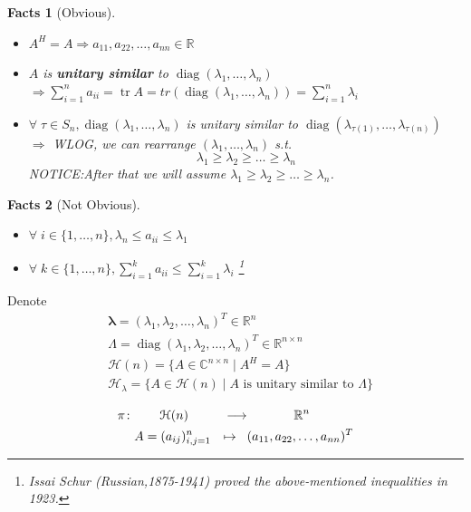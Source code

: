 \documentclass[11pt]{amsart}
\numberwithin{equation}{section}
\theoremstyle{plain}
\newtheorem*{fact}{Facts}
\theoremstyle{plain}
\numberwithin{equation}{section}
\theoremstyle{remark}
\DeclareMathOperator{\diag}{diag}
\DeclareMathOperator{\tr}{tr}
\begin{document}
\begin{fact}[Obvious]\
	\begin{itemize}
		\item $A^H=A \Rightarrow a_{11},a_{22},\ldots,a_{nn} \in \mathbb{R}$
		\item $A$ is \textbf{unitary similar} to $\diag(\lambda_1,\ldots,\lambda_n)$ \\
		$\Rightarrow \sum_{i=1}^n a_{ii} = \tr A = tr (\diag(\lambda_1,\ldots,\lambda_n))= \sum_{i=1}^n \lambda_i$
		\item $\forall\; \tau \in S_n, \diag (\lambda_1,\ldots,\lambda_n)$ is unitary similar to
		$\diag (\lambda_{\tau(1)},\ldots,\lambda_{\tau(n)})$ \\
		$\Rightarrow$ WLOG, we can rearrange $(\lambda_1,\ldots,\lambda_n)$ s.t.
		$$\lambda_1 \geqslant \lambda_2\geqslant\ldots\geqslant\lambda_n$$
		NOTICE:After that we will assume $\lambda_1 \geqslant \lambda_2\geqslant\ldots\geqslant\lambda_n$.
	\end{itemize}
\end{fact}
\begin{fact}[Not Obvious]\
	\begin{itemize}
		\item $\forall\; i \in \{1,\ldots, n\}, \lambda_n \leqslant a_{ii} \leqslant \lambda_1$
		\item $\forall\; k \in \{1,\ldots, n\}, \sum_{i=1}^k a_{ii} \leqslant \sum_{i=1}^k \lambda_i$ 
		\footnote{Issai Schur (Russian,1875-1941) proved the above-mentioned
			inequalities in 1923.}
	\end{itemize}
\end{fact}
Denote
\begin{align*}
	&\bm{\lambda} =(\lambda_1,\lambda_2,\ldots,\lambda_n)^T \in \mathbb{R}^n \\
	&\Lambda =\diag (\lambda_1,\lambda_2,\ldots,\lambda_n)^T \in \mathbb{R}^{n \times n} \\
	&\mathcal{H} (n)=\{A \in \mathbb{C}^{n \times n} \mid A^H=A\} \\
	&\mathcal{H}_\lambda=\{A \in \mathcal{H} (n) \mid A \text{ is unitary similar to } \Lambda\} \\
	\end{align*}
\begin{equation*}
	\begin{aligned}	
		\pi \colon & \qquad \mathcal{H} (n) &\longrightarrow &\hspace{1.3cm}  \mathbb{R}^n \\
		&A=(a_{ij})_{i,j=1}^n &\mapsto \hspace{0.3cm}&(a_{11},a_{22},\ldots,a_{nn})^T
	\end{aligned}
\end{equation*}
\end{document}
